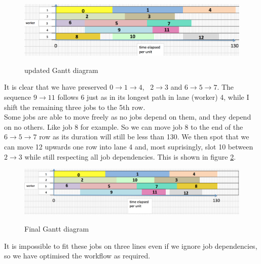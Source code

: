 \documentclass[paper=a4, fontsize=12pt]{scrartcl} %
\numberwithin{equation}{section}       %
\numberwithin{figure}{section}         %
\numberwithin{table}{section}          %
\begin{document}
\begin{figure}[h]
\caption{updated Gantt diagram}
\centering
\includegraphics[scale=0.5]{final2}\label{third}
\end{figure}
It is clear that we have preserved $0 \to 1 \to 4$, \ $2 \to 3$ and $6 \to 5 \to 7$. The sequence $9 \to 11$ follows $6$ just as in its longest path in lane (worker) 4, while I shift the remaining three jobs to the 5th row. \\
Some jobs are able to move freely as no jobs depend on them, and they depend on no others. Like job 8 for example. So we can move job 8 to the end of the $6 \to 5 \to 7$ row as its duration will still be less than 130. We then spot that we can move 12 upwards one row into lane 4 and, most suprisingly, slot 10 between $2 \to 3$ while still respecting all job dependencies. This is shown in figure \ref{fourth}.

\begin{figure}[h]
\caption{Final Gantt diagram}
\centering
\includegraphics[scale=0.5]{final3}\label{fourth}
\end{figure}

It is impossible to fit these jobs on three lines even if we ignore job dependencies, so we have optimised the workflow as required.
\end{document}
